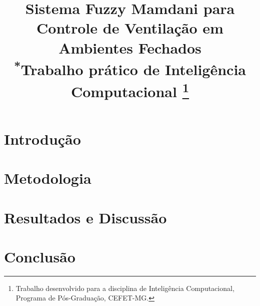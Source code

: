 \documentclass[conference]{IEEEtran}
\begin{document}
\title{Sistema Fuzzy Mamdani para Controle de Ventilação em Ambientes Fechados\\
{\footnotesize \textsuperscript{*}Trabalho prático de Inteligência Computacional}
\thanks{Trabalho desenvolvido para a disciplina de Inteligência Computacional, Programa de Pós-Graduação, CEFET-MG.}
}

\author{
\and
{}
}

\maketitle

\renewcommand{\abstractname}{Resumo}
\begin{abstract}

\end{abstract}

\renewcommand{\IEEEkeywordsname}{Palavras-chave}
\begin{IEEEkeywords}

\end{IEEEkeywords}

\section{Introdução}


\section{Metodologia}


\section{Resultados e Discussão}


\section{Conclusão}


\renewcommand{\refname}{Referências}


\end{document}
